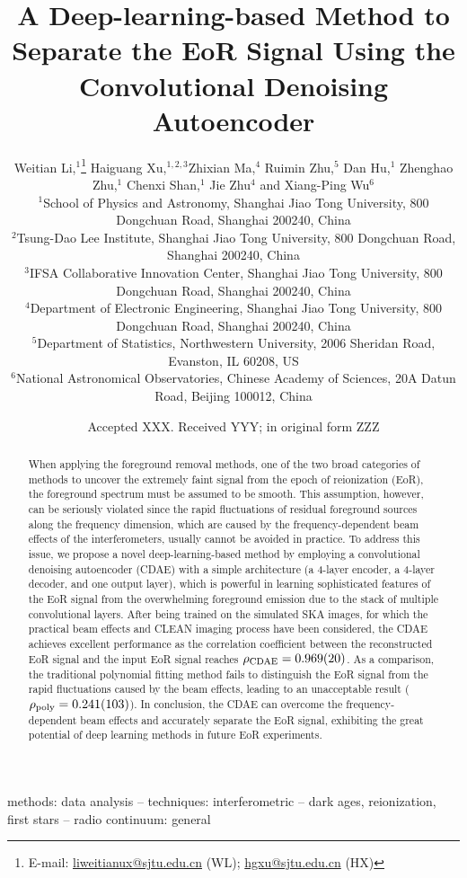 \documentclass[letters,a4paper,fleqn,usenatbib]{mnras}
\title[EoR Separation with CDAE]{%
  A Deep-learning-based Method to Separate the EoR Signal
  Using the Convolutional Denoising Autoencoder
}
\author[Li~et~al.]{%
Weitian Li,$^{1}$\thanks{E-mail:
  \href{mailto:liweitianux@sjtu.edu.cn}{liweitianux@sjtu.edu.cn} (WL);
  \href{mailto:hgxu@sjtu.edu.cn}{hgxu@sjtu.edu.cn} (HX)}
Haiguang Xu,$^{1,2,3}$\footnotemark[1]
Zhixian Ma,$^{4}$
Ruimin Zhu,$^{5}$
Dan Hu,$^{1}$
Zhenghao Zhu,$^{1}$
\newauthor
Chenxi Shan,$^{1}$
Jie Zhu$^{4}$
and
Xiang-Ping Wu$^{6}$
\\
$^{1}${School of Physics and Astronomy,
  Shanghai Jiao Tong University,
  800 Dongchuan Road, Shanghai 200240, China} \\
$^{2}${Tsung-Dao Lee Institute,
  Shanghai Jiao Tong University,
  800 Dongchuan Road, Shanghai 200240, China} \\
$^{3}${IFSA Collaborative Innovation Center,
  Shanghai Jiao Tong University,
  800 Dongchuan Road, Shanghai 200240, China} \\
$^{4}${Department of Electronic Engineering,
  Shanghai Jiao Tong University,
  800 Dongchuan Road, Shanghai 200240, China} \\
$^{5}${Department of Statistics,
  Northwestern University,
  2006 Sheridan Road, Evanston, IL 60208, US} \\
$^{6}${National Astronomical Observatories,
  Chinese Academy of Sciences,
  20A Datun Road, Beijing 100012, China}
}
\date{Accepted XXX. Received YYY; in original form ZZZ}
\newcommand{\R}[1]{\mathrm{#1}}
\begin{document}
\label{firstpage}
\pagerange{\pageref{firstpage}--\pageref{lastpage}}
\maketitle

%
%
\begin{abstract}
{\color{cyan}%
When applying the foreground removal methods, one of the two broad
categories of methods to uncover the extremely faint signal from the
epoch of reionization (EoR), the foreground spectrum must be assumed
to be smooth.
This assumption, however, can be seriously violated since the rapid
fluctuations of residual foreground sources along the frequency
dimension, which are caused by the frequency-dependent beam effects of
the interferometers, usually cannot be avoided in practice.
To address this issue, we propose a novel deep-learning-based method
by employing a convolutional denoising autoencoder (CDAE) with a simple
architecture (a 4-layer encoder, a 4-layer decoder, and one output layer),
which is powerful in learning sophisticated features of the EoR signal
from the overwhelming foreground emission due to the stack of multiple
convolutional layers.
After being trained on the simulated SKA images, for which the practical
beam effects and CLEAN imaging process have been considered,
the CDAE achieves excellent performance as the correlation coefficient
between the reconstructed EoR signal and the input EoR signal reaches
$\rho_{\R{CDAE}} = \num{0.969 +- 0.020}$.
As a comparison, the traditional polynomial fitting method fails to
distinguish the EoR signal from the rapid fluctuations caused by the
beam effects, leading to an unacceptable result
($\rho_{\R{poly}} = \num{0.241 +- 0.103}$).
In conclusion, the CDAE can overcome the frequency-dependent beam effects
and accurately separate the EoR signal, exhibiting the great potential
of deep learning methods in future EoR experiments.} %
\end{abstract}

\begin{keywords}
methods: data analysis --
techniques: interferometric --
dark ages, reionization, first stars --
radio continuum: general
\end{keywords}


\end{document}
